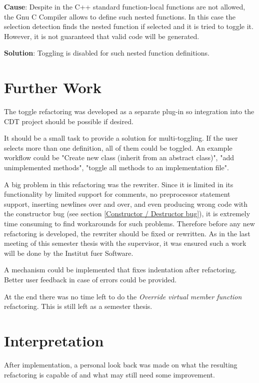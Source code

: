 \textbf{Cause}: Despite in the C++ standard\cite{IsoCpp} function-local 
functions are not allowed, the Gnu C Compiler allows to define such nested 
functions\cite{GCC}. In this case the selection detection finds the nested 
function if selected and it is tried to toggle it. However, it is not guaranteed 
that valid code will be generated.

\textbf{Solution}: Toggling is disabled for such nested function definitions.

\section{Further Work}

The toggle refactoring was developed as a separate plug-in so integration into 
the CDT project should be possible if desired.

It should be a small task to provide a solution for multi-toggling. If the user 
selects more than one definition, all of them could be toggled. An example 
workflow could be "Create new class (inherit from an abstract class)", "add 
unimplemented methods", "toggle all methods to an implementation file".

A big problem in this refactoring was the rewriter. Since it is limited in its
functionality by limited support for comments, no preprocessor statement
support, inserting newlines over and over, and even producing wrong code with
the constructor bug (see section \ref{Constructor / Destructor bug}), it is
extremely time consuming to find workarounds for such problems.
Therefore before any new refactoring is developed, the rewriter should be
fixed or rewritten.
As in the last meeting of this semester thesis with the supervisor, it was
ensured such a work will be done by the Institut fuer Software.

A mechanism could be implemented that fixes indentation after refactoring.
Better user feedback in case of errors could be provided.

At the end there was no time left to do the \textit{Override virtual member
function} refactoring. This is still left as a semester thesis.

\section{Interpretation}
\thispagestyle{fancy}

After implementation, a personal look back was made on what the resulting
refactoring is capable of and what may still need some improvement.

